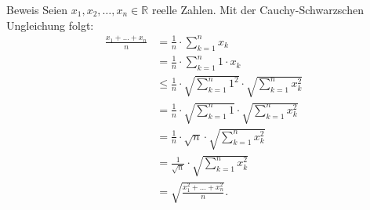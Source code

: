 \documentclass[10pt]{beamer}
\def\bR{\mathbb{R}}
\begin{document}
\begin{frame}{Beweis}
    Seien \( x_{1}, x_{2}, \ldots, x_{n} \in \bR \) reelle Zahlen. Mit der Cauchy-Schwarzschen Ungleichung folgt:
    {\small
    \begin{align*}
        \frac{x_{1} + \ldots + x_{n}}{n} 
        & = \frac{1}{n} \cdot \sum_{k = 1}^{n} x_{k} \\
        & = \frac{1}{n} \cdot \sum_{k = 1}^{n} 1 \cdot x_{k} \\
        & \leq \frac{1}{n} \cdot \sqrt{\sum_{k = 1}^{n} 1^{2}} \cdot \sqrt{\sum_{k = 1}^{n} x_{k}^{2}} \\
        & = \frac{1}{n} \cdot \sqrt{\sum_{k = 1}^{n} 1} \cdot \sqrt{\sum_{k = 1}^{n} x_{k}^{2}} \\
        & = \frac{1}{n} \cdot \sqrt{n} \cdot \sqrt{\sum_{k = 1}^{n} x_{k}^{2}} \\
        & = \frac{1}{\sqrt{n}} \cdot \sqrt{\sum_{k = 1}^{n} x_{k}^{2}} \\
        & = \sqrt{\frac{x_{1}^{2} + \ldots + x_{n}^{2}}{n}}.
    \end{align*}
    }
\end{frame}
\end{document}
